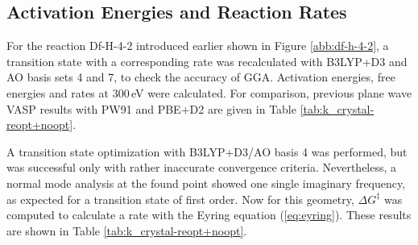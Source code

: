 \documentclass[11pt,DIV=13,BCOR=5mm,a4paper,headinclude]{scrbook}
\begin{document}
\subsection{Activation Energies and Reaction Rates}\label{crystal-rate}
For the reaction Df-H-4-2 introduced earlier shown in Figure \ref{abb:df-h-4-2}, a transition state with a corresponding rate was recalculated with B3LYP+D3 and AO basis sets 4 and 7, to check the accuracy of GGA.
Activation energies, free energies and rates at $300\,$eV were calculated.
For comparison, previous plane wave VASP results with PW91 and PBE+D2 are given in Table \ref{tab:k_crystal-reopt+noopt}.


A transition state optimization with B3LYP+D3/AO basis 4 was performed, but was successful only with rather inaccurate convergence criteria.
Nevertheless, a normal mode analysis at the found point showed one single imaginary frequency, as expected for a transition state of first order.
Now for this geometry, $\Delta G^\ddagger$ was computed to calculate a rate with the Eyring equation (\ref{eq:eyring}).
These results are shown in Table \ref{tab:k_crystal-reopt+noopt}. %
\end{document}
